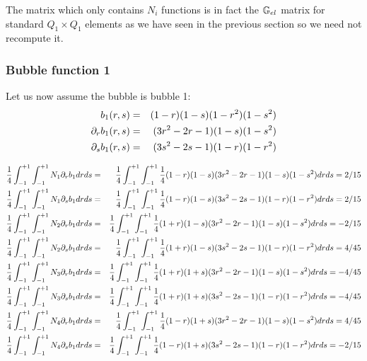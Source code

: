 The matrix which only contains $N_i$ functions is in fact the ${\mathbb{G}}_{el}$ matrix for standard $Q_1\times Q_1$ elements
as we have seen in the previous section so we need not recompute it. 

\subsubsection{Bubble function 1}
Let us now assume the bubble is bubble 1:
\begin{eqnarray}
b_1(r,s)&=&(1-r)(1-s)(1-r^2)(1-s^2) \nonumber\\
\partial_r b_1(r,s) &=& (3r^2-2r-1)(1-s)(1-s^2) \nonumber\\
\partial_s b_1(r,s) &=& (3s^2-2s-1)(1-r)(1-r^2) \nonumber
\end{eqnarray}

\begin{tiny}
\begin{eqnarray}
\frac{1}{4} \int_{-1}^{+1}\int_{-1}^{+1} N_1 \partial_r b_1 drds &=& \frac{1}{4} \int_{-1}^{+1}\int_{-1}^{+1} \frac{1}{4}(1-r)(1-s) (3r^2-2r-1)(1-s)(1-s^2) dr ds = 2/15 \nonumber\\
\frac{1}{4} \int_{-1}^{+1}\int_{-1}^{+1} N_1 \partial_s b_1 drds &=& \frac{1}{4} \int_{-1}^{+1}\int_{-1}^{+1} \frac{1}{4}(1-r)(1-s) (3s^2-2s-1)(1-r)(1-r^2) dr ds = 2/15 \nonumber\\
\frac{1}{4} \int_{-1}^{+1}\int_{-1}^{+1} N_2 \partial_r b_1 drds &=& \frac{1}{4} \int_{-1}^{+1}\int_{-1}^{+1} \frac{1}{4}(1+r)(1-s) (3r^2-2r-1)(1-s)(1-s^2) dr ds = -2/15 \nonumber\\
\frac{1}{4} \int_{-1}^{+1}\int_{-1}^{+1} N_2 \partial_s b_1 drds &=& \frac{1}{4} \int_{-1}^{+1}\int_{-1}^{+1} \frac{1}{4}(1+r)(1-s) (3s^2-2s-1)(1-r)(1-r^2) dr ds = 4/45 \nonumber\\
\frac{1}{4} \int_{-1}^{+1}\int_{-1}^{+1} N_3 \partial_r b_1 drds &=& \frac{1}{4} \int_{-1}^{+1}\int_{-1}^{+1} \frac{1}{4}(1+r)(1+s) (3r^2-2r-1)(1-s)(1-s^2) dr ds = -4/45 \nonumber\\
\frac{1}{4} \int_{-1}^{+1}\int_{-1}^{+1} N_3 \partial_s b_1 drds &=& \frac{1}{4} \int_{-1}^{+1}\int_{-1}^{+1} \frac{1}{4}(1+r)(1+s) (3s^2-2s-1)(1-r)(1-r^2) dr ds = -4/45 \nonumber\\
\frac{1}{4} \int_{-1}^{+1}\int_{-1}^{+1} N_4 \partial_r b_1 drds &=& \frac{1}{4} \int_{-1}^{+1}\int_{-1}^{+1} \frac{1}{4}(1-r)(1+s) (3r^2-2r-1)(1-s)(1-s^2) dr ds = 4/45 \nonumber\\
\frac{1}{4} \int_{-1}^{+1}\int_{-1}^{+1} N_4 \partial_s b_1 drds &=& \frac{1}{4} \int_{-1}^{+1}\int_{-1}^{+1} \frac{1}{4}(1-r)(1+s) (3s^2-2s-1)(1-r)(1-r^2) dr ds = -2/15 \nonumber
\end{eqnarray}
\end{tiny}



